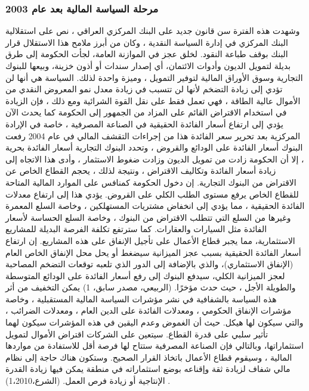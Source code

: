 \documentclass[10pt,a4paper]{report}
\begin{document}
\begin{doublespacing}
\subsubsection{مرحلة السياسة المالية بعد عام 2003}
وشهدت هذه الفترة سن قانون جديد على البنك المركزي العراقي ، نص على استقلالية البنك المركزي في إدارة السياسة النقدية ، وكان من أبرز ملامح هذا الاستقلال قرار البنك بوقف طباعة النقود. لخلق عجز في الموازنة العامة، لجأت الحكومة إلى طرق بديلة لتمويل الديون وأدوات الائتمان، أي إصدار سندات أو أذون خزينة، وبيعها للبنوك التجارية وسوق الأوراق المالية لتوفير التمويل ، وميزة واحدة لذلك. السياسة هي أنها لن تؤدي إلى زيادة التضخم لأنها لن تتسبب في زيادة معدل نمو المعروض النقدي من الأموال عالية الطاقة ، فهي تعمل فقط على نقل القوة الشرائية ومع ذلك ، فإن الزيادة في استخدام الاقتراض القائم على المزاد من الجمهور إلى الحكومة كما يحدث الآن يؤدي إلى ارتفاع أسعار الفائدة الحقيقية في الصناعة المصرفية ، خاصة في الإرادة المركزية بعد تحرير سعر الفائدة هذا من إجراءات التقشف المالي في عام 2004 رفعت البنوك أسعار الفائدة على الودائع والقروض ، وتحدد البنوك التجارية أسعار الفائدة بحرية ، إلا أن الحكومة زادت من تمويل الديون وزادت ضغوط الاستثمار ، وأدى هذا الاتجاه إلى زيادة أسعار الفائدة وتكاليف الاقتراض ، ونتيجة لذلك ، يحجم القطاع الخاص عن الاقتراض من البنوك التجارية. إن دخول الحكومة كمنافس على الموارد المالية المتاحة للقطاع الخاص يرفع مستوى الطلب الكلي على القروض. يؤدي هذا إلى ارتفاع معدلات الفائدة الحقيقية ، مما يؤدي إلى انخفاض مشتريات المستهلكين ، وخاصة السلع المعمرة وغيرها من السلع التي تتطلب الاقتراض من البنوك ، وخاصة السلع الحساسة لأسعار الفائدة مثل السيارات والعقارات. كما سترتفع تكلفة الفرصة البديلة للمشاريع الاستثمارية، مما يجبر قطاع الأعمال على تأجيل الإنفاق على هذه المشاريع. إن ارتفاع أسعار الفائدة الحقيقية بسبب عجز الميزانية سيضغط أو يحل محل الإنفاق الخاص العام (الإنفاق الاستثماري)، والذي بالإضافة إلى الدور الذي تلعبه توقعات التضخم المصاحبة لعجز الميزانية الكلي، سيدفع البنوك إلى رفع أسعار الفائدة على الودائع المتوسطة والطويلة الأجل ، حيث حدث مؤخرًا. (الربيعي، مصدر سابق، 1) يمكن التخفيف من أثر هذه السياسة بالشفافية في نشر مؤشرات السياسة المالية المستقبلية ، وخاصة مؤشرات الإنفاق الحكومي ، ومعدلات الفائدة على الدين العام ، ومعدلات الضرائب ، والتي سيكون لها هيكل. حيث أن الغموض وعدم اليقين في هذه المؤشرات سيكون لهما تأثير سلبي على قدرة القطاع. سيتعين على الشركات اقتراض الأموال لتمويل استثماراتها، وبالتالي فإن الصناعة المصرفية ستتاح لها فرصة أقل للاستفادة من مواردها المالية ، وسيقوم قطاع الأعمال باتخاذ القرار الصحيح. وستكون هناك حاجة إلى نظام مالي شفاف لزيادة ثقة وإقناعه بوضع استثماراته في منطقة يمكن فيها زيادة القدرة الإنتاجية أو زيادة فرص العمل. (الشرع،1،2010) .

\end{doublespacing}
\end{document}

